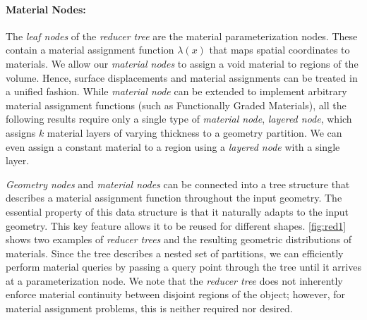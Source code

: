\paragraph{Material Nodes:} The \emph{leaf nodes} of the \emph{reducer tree} are the material parameterization nodes. These contain a material assignment function $\lambda\left(x\right)$ that maps spatial coordinates to materials. We allow our \emph{material nodes} to assign a void material to regions of the volume. Hence, surface displacements and material assignments can be treated in a unified fashion.
While \emph{material node} can be extended to implement arbitrary material assignment functions (such as Functionally Graded Materials), all the following results require only a single type of \emph{material node}, \emph{layered node}, which assigns $k$ material layers of varying thickness to a geometry partition. We can even assign a constant material to a region using a \emph{layered node} with a single layer. 

\emph{Geometry nodes} and \emph{material nodes} can be connected into a tree structure that describes a material assignment function throughout the input geometry. 
The essential property of this data structure is that it naturally adapts to the input geometry. This key feature allows it to be reused for different shapes.
\autoref{fig:red1} shows two examples of \emph{reducer trees} and the resulting geometric distributions of materials.
Since the tree describes a nested set of partitions, we can efficiently perform material queries by passing a query point through the tree until it arrives at a parameterization node. 
We note that the \emph{reducer tree} does not inherently enforce material continuity between disjoint regions of the object; however, for material assignment problems, this is neither required nor desired. 

